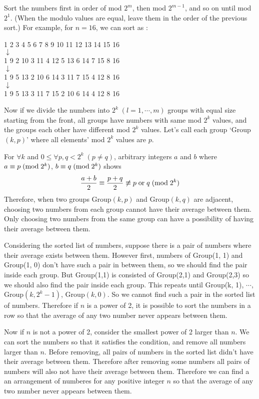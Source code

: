 \documentclass[10pt]{article}
\begin{document}
\vspace{3mm}
Sort the numbers first in order of mod $2^m$, then mod $2^{m-1}$, and so on until mod $2^1$. (When the modulo values are equal, leave them in the order of the previous sort.)
For example, for $n=16$, we can sort as :
\begin{center}
    1 2 3 4 5 6 7 8 9 10 11 12 13 14 15 16 \\
    $\downarrow$ \\
    1 9 2 10 3 11 4 12 5 13 6 14 7 15 8 16 \\
    $\downarrow$ \\
    1 9 5 13 2 10 6 14 3 11 7 15 4 12 8 16 \\
    $\downarrow$ \\
    1 9 5 13 3 11 7 15 2 10 6 14 4 12 8 16
\end{center}
Now if we divide the numbers into $2^k \; (l = 1, \cdots , m)$ groups with equal size starting from the front, all groups have numbers with same mod $2^k$ values, and the groups each other have different mod $2^k$ values.
Let's call each group `Group$(k, p)$' where all elements' mod $2^k$ values are $p$.

\vspace{3mm}
For $\forall k$ and $0 \leq \forall p, q < 2^k \; (p \neq q)$, arbitrary integers $a$ and $b$ where $a \equiv p \; ({\rm mod} \; 2^k)$, $b \equiv q \; ({\rm mod} \; 2^k)$ shows
$$\frac{a+b}{2} \equiv \frac{p+q}{2} \not\equiv p {\; \rm or \;} q \; ({\rm mod} \; 2^k)$$
Therefore, when two groups Group$(k, p)$ and Group$(k, q)$ are adjacent, choosing two numbers from each group cannot have their average between them. 
Only choosing two numbers from the same group can have a possibility of having their average between them.

\vspace{3mm}
Considering the sorted list of numbers, suppose there is a pair of numbers where their average exists between them. 
However first, numbers of Group(1, 1) and Group(1, 0) don't have such a pair in between them, so we should find the pair inside each group.
But Group(1,1) is consisted of Group(2,1) and Group(2,3) so we should also find the pair inside each group.
This repeats until Group(k, 1), $\cdots$, Group$(k, 2^k-1)$, Group$(k, 0)$. So we cannot find such a pair in the sorted list of numbers.
Therefore if $n$ is a power of 2, it is possible to sort the numbers in a row so that the average of any two number never appears between them.

\vspace{3mm}
Now if $n$ is not a power of 2, consider the smallest power of 2 larger than $n$.
We can sort the numbers so that it satisfies the condition, and remove all numbers larger than $n$.
Before removing, all pairs of numbers in the sorted list didn't have their average between them.
Therefore after removing some numbers all pairs of numbers will also not have their average between them.
Therefore we can find a an arrangement of numberes for any positive integer $n$ so that the average of any two number never appears between them.
\end{document}
